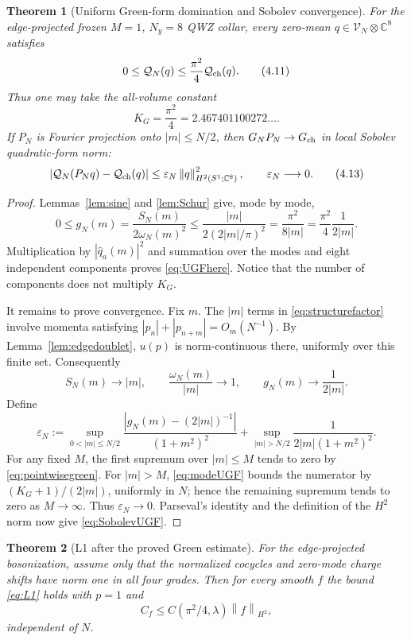 \documentclass[11pt]{article}
\newtheorem{theorem}{Theorem}[section]
\theoremstyle{remark}
\newcommand{\V}{\mathcal V}
\newcommand{\C}{\mathbb C}
\newcommand{\norm}[1]{\left\lVert#1\right\rVert}
\begin{document}
\begin{theorem}[Uniform Green-form domination and Sobolev convergence]
\label{thm:UGF}
For the edge-projected frozen $M=1$, $N_y=8$ QWZ collar, every
zero-mean $q\in\V_N\otimes\C^8$ satisfies
\[
 0\le\mathcal Q_N(q)
 \le\frac{\pi^2}{4}\mathcal Q_{\rm ch}(q).
\tag{4.11}\label{eq:UGFhere}
\]
Thus one may take the all-volume constant
\[
 K_G=\frac{\pi^2}{4}=2.467401100272\ldots .
\tag{4.12}\label{eq:KG}
\]
If $P_N$ is Fourier projection onto $|m|\le N/2$, then
$G_NP_N\to G_{\rm ch}$ in local Sobolev quadratic-form norm:
\[
 \left|\mathcal Q_N(P_Nq)-\mathcal Q_{\rm ch}(q)\right|
 \le\varepsilon_N\norm{q}_{H^2(S^1;\C^8)}^2,
 \qquad\varepsilon_N\longrightarrow0.
\tag{4.13}\label{eq:SobolevUGF}
\]
\end{theorem}

\begin{proof}
Lemmas~\ref{lem:sine} and \ref{lem:Schur} give, mode by mode,
\[
 0\le g_N(m)
 =\frac{S_N(m)}{2\omega_N(m)^2}
 \le\frac{|m|}{2(2|m|/\pi)^2}
 =\frac{\pi^2}{8|m|}
 =\frac{\pi^2}{4}\frac1{2|m|}.
\tag{4.14}\label{eq:modeUGF}
\]
Multiplication by $|\widehat q_a(m)|^2$ and summation over the modes and
eight independent components proves \eqref{eq:UGFhere}.  Notice that
the number of components does not multiply $K_G$.

It remains to prove convergence.  Fix $m$.  The $|m|$ terms in
\eqref{eq:structurefactor} involve momenta satisfying
$|p_n|+|p_{n+m}|=O_m(N^{-1})$.  By
Lemma~\ref{lem:edgedoublet}, $u(p)$ is norm-continuous there, uniformly
over this finite set.  Consequently
\[
 S_N(m)\longrightarrow |m|,
\qquad
 \frac{\omega_N(m)}{|m|}\longrightarrow1,
\qquad
 g_N(m)\longrightarrow\frac1{2|m|}.
\tag{4.15}\label{eq:pointwisegreen}
\]
Define
\[
 \varepsilon_N:=
 \sup_{0<|m|\le N/2}
 \frac{|g_N(m)-(2|m|)^{-1}|}{(1+m^2)^2}
 +\sup_{|m|>N/2}\frac{1}{2|m|(1+m^2)^2}.
\tag{4.16}\label{eq:epsilonN}
\]
For any fixed $M$, the first supremum over $|m|\le M$ tends to zero by
\eqref{eq:pointwisegreen}.  For $|m|>M$,
\eqref{eq:modeUGF} bounds the numerator by
$(K_G+1)/(2|m|)$, uniformly in $N$; hence the remaining supremum tends
to zero as $M\to\infty$.  Thus $\varepsilon_N\to0$.  Parseval's identity
and the definition of the $H^2$ norm now give
\eqref{eq:SobolevUGF}.
\end{proof}

\begin{theorem}[L1 after the proved Green estimate]
\label{thm:L1reduction}
For the edge-projected bosonization, assume only that the normalized
cocycles and zero-mode charge shifts have norm one in all four grades.
Then for every smooth $f$ the bound \eqref{eq:L1} holds with $p=1$ and
\[
 C_f\le C(\pi^2/4,\lambda)\norm{f}_{H^2},
\tag{4.17}\label{eq:Cf}
\]
independent of $N$.
\end{theorem}
\end{document}
